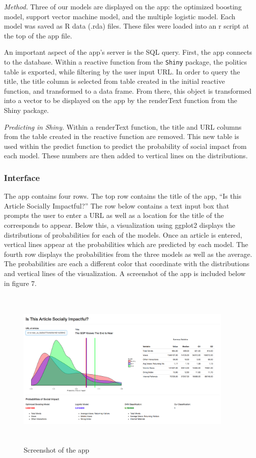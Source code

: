 \documentclass[10pt,letterpaper]{article}
\begin{document}
\emph{Method.} Three of our models are displayed on the app: the
optimized boosting model, support vector machine model, and the multiple
logistic model. Each model was saved as R data (.rda) files. These files
were loaded into an r script at the top of the app file.

An important aspect of the app's server is the SQL query. First, the app
connects to the database. Within a reactive function from the
\texttt{Shiny} package, the politics table is exported, while filtering
by the user input URL. In order to query the title, the title column is
selected from table created in the initial reactive function, and
transformed to a data frame. From there, this object is transformed into
a vector to be displayed on the app by the renderText function from the
Shiny package.

\emph{Predicting in Shiny.} Within a renderText function, the title and
URL columns from the table created in the reactive function are removed.
This new table is used within the predict function to predict the
probability of social impact from each model. These numbers are then
added to vertical lines on the distributions.

\hypertarget{interface}{%
\subsubsection{Interface}\label{interface}}

The app contains four rows. The top row contains the title of the app,
``Is this Article Socially Impactful?'' The row below contains a text
input box that prompts the user to enter a URL as well as a location for
the title of the corresponds to appear. Below this, a visualization
using ggplot2 displays the distributions of probabilities for each of
the models. Once an article is entered, vertical lines appear at the
probabilities which are predicted by each model. The fourth row displays
the probabilities from the three models as well as the average. The
probabilities are each a different color that coordinate with the
distributions and vertical lines of the visualization. A screenshot of
the app is included below in figure 7.

\begin{figure}
\includegraphics[width=400px,height=300px]{app} \caption{Screenshot of the app}\label{fig:unnamed-chunk-7}
\end{figure}
\end{document}
